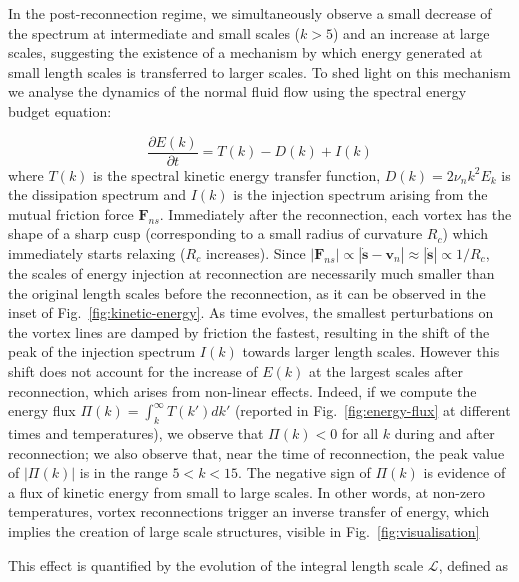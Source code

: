 \documentclass[%
 reprint,
 amsmath,amssymb,
 aps,
 prl,
]{revtex4-2}
\def \s{\mathbf{s}}
\def \v{\mathbf{v}}
\def \k{\mathbf{k}}
\begin{document}
{In the post-reconnection regime, we simultaneously observe a small 
decrease of the spectrum at intermediate 
and small scales ($k > 5$) and an increase at large scales, 
suggesting the existence of a mechanism by 
which energy generated at small length scales is transferred to larger scales. 
To shed light on this mechanism
we analyse the dynamics of the normal fluid flow using the 
spectral energy budget equation: 

\begin{equation}
    \frac{\partial E(k)}{\partial t} = T(k) - D(k) + I(k)
\end{equation}
where $T(k)$ is the spectral kinetic energy transfer function,
$D(k)=2\nu_n k^2 E_k$ is the dissipation spectrum and
$I(k)$ is the injection spectrum arising from the mutual friction 
force $\mathbf{F}_{ns}$. 
Immediately after the reconnection, each vortex has the shape of
a sharp cusp (corresponding to a small radius of curvature $R_c$)
which immediately starts relaxing ($R_c$ increases). Since
$|\mathbf{F}_{ns}| \propto  |\dot{\s}-\v_n| \approx |\dot{\s}| \propto 1/R_c$, 
the scales of energy injection at reconnection are necessarily
much smaller than the original length scales before the reconnection, 
as it can be observed in the inset of Fig.~\ref{fig:kinetic-energy}. 
As time evolves, the smallest perturbations on the vortex lines are damped 
by friction the fastest, resulting in the shift of 
the peak of the injection spectrum $I(k)$ towards larger length scales. 
However this shift does not account 
for the increase of $E(k)$ at the largest scales after reconnection, 
which arises from non-linear effects.
Indeed, if we compute the energy flux 
$\displaystyle \Pi(k) = \int_{k}^{\infty}T(k') dk'$ 
(reported in Fig.~\ref{fig:energy-flux} at different times and temperatures), 
we observe that $\Pi(k) < 0$ for all $k$ during and after reconnection;
we also observe that, near the time of reconnection,
the peak value of $|\Pi(k)|$ is in the range $5 < k < 15$.
The negative sign of $\Pi(k)$ is evidence of a flux of kinetic 
energy from small to large scales. In other words, at non-zero temperatures,
vortex reconnections trigger an inverse transfer of energy, 
which implies the creation of large scale structures, visible
in Fig.~\ref{fig:visualisation}} 
This effect is quantified by
the evolution of the integral length scale $\mathcal{L}$, 
defined as
\end{document}
